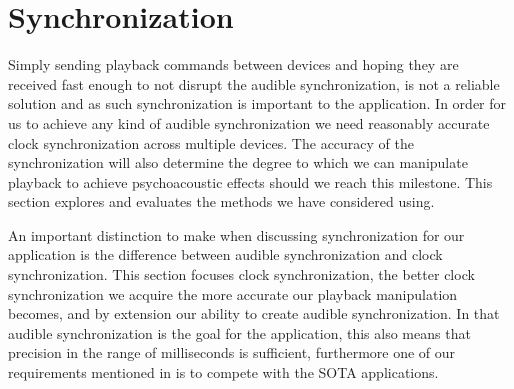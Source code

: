 \chapter{Synchronization}
Simply sending playback commands between devices and hoping they are received fast enough to not disrupt the audible synchronization, is not a reliable solution and as such synchronization is important to the application.
In order for us to achieve any kind of audible synchronization we need reasonably accurate clock synchronization across multiple devices.
The accuracy of the synchronization will also determine the degree to which we can manipulate playback to achieve psychoacoustic effects should we reach this milestone.
This section explores and evaluates the methods we have considered using.

An important distinction to make when discussing synchronization for our application is the difference between audible synchronization and clock synchronization.
This section focuses clock synchronization, the better clock synchronization we acquire the more accurate our playback manipulation becomes, and by extension our ability to create audible synchronization.
In that audible synchronization is the goal for the application, this also means that precision in the range of milliseconds is sufficient, furthermore one of our requirements mentioned in  is to compete with the \ac{SOTA} applications.

